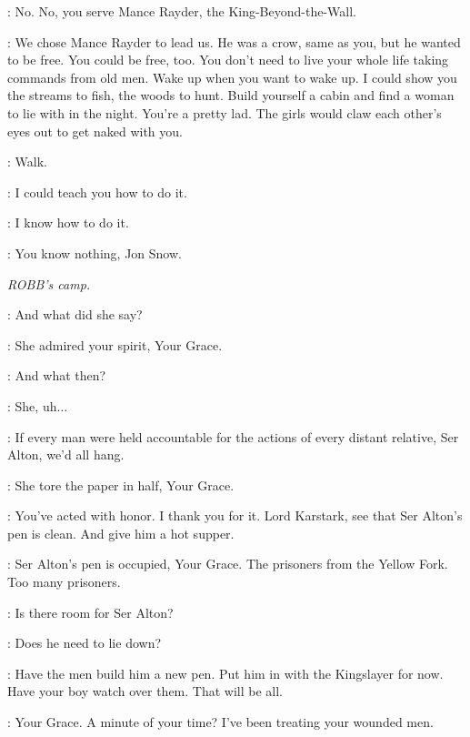 \JON: No. No, you serve Mance Rayder, the King-Beyond-the-Wall.


\YGRITTE: We chose Mance Rayder to lead us. He was a crow, same as you, but he wanted to be free. You could be free, too. You don't need to live your whole life taking commands from old men. Wake up when you want to wake up. I could show you the streams to fish, the woods to hunt. Build yourself a cabin and find a woman to lie with in the night. You're a pretty lad. The girls would claw each other's eyes out to get naked with you.

\JON: Walk.

\YGRITTE: I could teach you how to do it.

\JON: I know how to do it.

\YGRITTE: You know nothing, Jon Snow.



\scene

\textit{ROBB's camp.}


\ROBB: And what did she say?

\ALTON: She admired your spirit, Your Grace.

\ROBB: And what then?

\ALTON: She, uh$\ldots$

\ROBB: If every man were held accountable for the actions of every distant relative, Ser Alton, we'd all hang.

\ALTON: She tore the paper in half, Your Grace.

\ROBB: You've acted with honor. I thank you for it. Lord Karstark, see that Ser Alton's pen is clean. And give him a hot supper.

\KARSTARK: Ser Alton's pen is occupied, Your Grace. The prisoners from the Yellow Fork. Too many prisoners.

\ROBB: Is there room for Ser Alton?

\KARSTARK: Does he need to lie down?

\ROBB: Have the men build him a new pen. Put him in with the Kingslayer for now. Have your boy watch over them. That will be all.


\TALISA: Your Grace. A minute of your time? I've been treating your wounded men.

